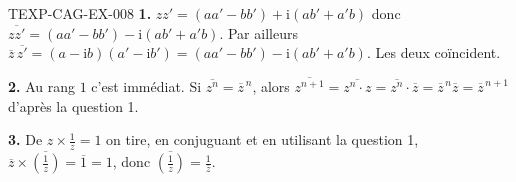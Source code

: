 \begin{corrige}{TEXP-CAG-EX-008}
\textbf{1.} $zz'=(aa'-bb')+\mathrm{i}(ab'+a'b)$ donc
$\overline{zz'}=(aa'-bb')-\mathrm{i}(ab'+a'b)$. Par ailleurs
$\overline{z}\,\overline{z'}=(a-\mathrm{i}b)(a'-\mathrm{i}b')
=(aa'-bb')-\mathrm{i}(ab'+a'b)$. Les deux coïncident.

\textbf{2.} Au rang $1$ c'est immédiat. Si $\overline{z^n}=\overline{z}^{\,n}$,
alors $\overline{z^{n+1}}=\overline{z^n\cdot z}
=\overline{z^n}\cdot\overline{z}=\overline{z}^{\,n}\overline{z}
=\overline{z}^{\,n+1}$ d'après la question 1.

\textbf{3.} De $z\times\frac1z=1$ on tire, en conjuguant et en utilisant la
question 1, $\overline{z}\times\overline{\left(\frac1z\right)}=\overline{1}=1$,
donc $\overline{\left(\frac1z\right)}=\frac{1}{\overline{z}}$.
\end{corrige}

